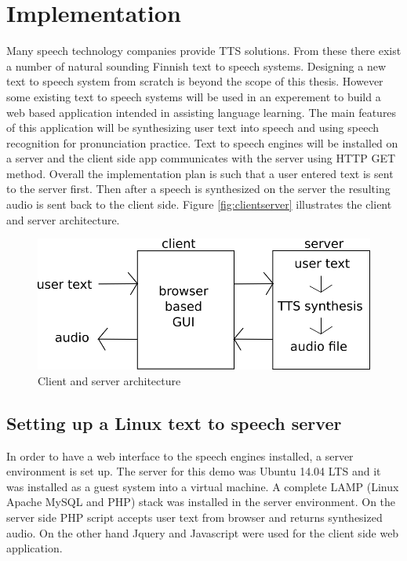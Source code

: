 \documentclass[11pt,a4paper,oneside,article]{memoir}
\begin{document}
\clearpage
\chapter{Implementation}

Many speech technology companies provide TTS solutions. From these there exist a number of natural sounding Finnish text to speech systems. Designing a new text to speech system from scratch is beyond the scope of this thesis. However some existing text to speech systems will be used in an experement to build a web based application  intended in assisting language learning. The main features of this application will be synthesizing user text into speech and using speech recognition for pronunciation practice. Text to speech engines will be installed on a server and the client side app communicates with the server using HTTP GET method. Overall the implementation plan is such that a user entered text is sent to the server first. Then after a speech is synthesized on the server the resulting audio is sent back to the client side.  Figure \vref{fig:clientserver} illustrates the client and server architecture.

\begin{figure}[h]
  \includegraphics[width=12cm]{clientserver}
  \caption{Client and server architecture}
  \label{fig:clientserver}
\end{figure}


\section{Setting up a Linux text to speech server }
In order to have a web interface to the speech engines installed, a server environment is set up. The server for this demo was Ubuntu 14.04 LTS and it was installed as a guest system into a virtual machine. A complete LAMP (Linux Apache MySQL and PHP) stack was installed in the server environment. On the server side PHP script accepts user text from browser and returns synthesized audio. On the other hand Jquery and Javascript were used for the client side web application. 
\end{document}
